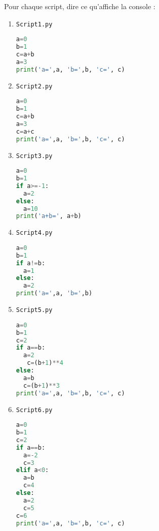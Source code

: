 \documentclass[a4paper, 11pt,reqno]{article}
\begin{document}
\begin{exercice}
Pour chaque script, dire ce qu'affiche la console : 



\begin{minipage}{0.45\textwidth}   %
\begin{enumerate}
\item  \texttt{Script1.py}

\begin{lstlisting}[language=Python]
a=0
b=1
c=a+b
a=3
print('a=',a, 'b=',b, 'c=', c)
\end{lstlisting}

\vspace{1.5cm}


\item \texttt{Script2.py}
\begin{lstlisting}[language=Python]
a=0
b=1
c=a+b
a=3
c=a+c
print('a=',a, 'b=',b, 'c=', c)
\end{lstlisting}



\vspace{1.5cm}
\item \texttt{Script3.py}
\begin{lstlisting}[language=Python]
a=0
b=1
if a>=-1:
  a=2
else:
  a=10
print('a+b=', a+b)
\end{lstlisting}


\end{enumerate}
\end{minipage}
\hfill\vline\hfill
\begin{minipage}{0.44\textwidth} %

\begin{enumerate} \setcounter{enumi}{3}
\item \texttt{Script4.py}
\begin{lstlisting}[language=Python]
a=0
b=1
if a!=b:
  a=1
else:
  a=2
print('a=',a, 'b=',b)
\end{lstlisting}

 \item \texttt{Script5.py}
\begin{lstlisting}[language=Python]
a=0
b=1
c=2
if a==b:
  a=2
   c=(b+1)**4
else:
  a=b
  c=(b+1)**3
print('a=',a, 'b=',b, 'c=', c)
\end{lstlisting}

\item \texttt{Script6.py}
\begin{lstlisting}[language=Python]
a=0
b=1
c=2
if a==b:
  a=-2
  c=3
elif a<0:
  a=b
  c=4
else:
  a=2
  c=5
c=6
print('a=',a, 'b=',b, 'c=', c)
\end{lstlisting}


\end{enumerate}
\end{minipage}
\end{exercice}
\end{document}
